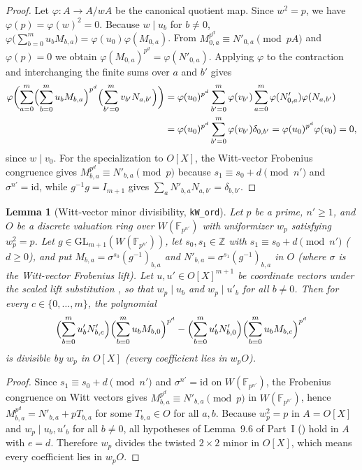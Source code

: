 \documentclass[11pt]{amsart}
\newcommand{\Z}{\mathbb{Z}}
\theoremstyle{plain}
\newtheorem{lemma}[theorem]{Lemma}
\theoremstyle{definition}
\numberwithin{equation}{section}
\begin{document}
\begin{proof}
Let $\varphi:A\to A/wA$ be the canonical quotient map. Since $w^2=p$, we have $\varphi(p)=\varphi(w)^2=0$.
Because $w\mid u_b$ for $b\neq 0$, $\varphi\bigl(\sum_{b=0}^m u_b M_{b,a}\bigr)=\varphi(u_0)\varphi(M_{0,a})$.
From $M_{0,a}^{p^d}\equiv N'_{0,a}\pmod{pA}$ and $\varphi(p)=0$ we obtain
$\varphi(M_{0,a})^{p^d}=\varphi(N'_{0,a})$. Applying $\varphi$ to the contraction and interchanging
the finite sums over $a$ and $b'$ gives
\begin{align*}
\varphi\biggl(\sum_{a=0}^m\Bigl(\sum_{b=0}^m u_b M_{b,a}\Bigr)^{p^d}\Bigl(\sum_{b'=0}^m v_{b'}N_{a,b'}\Bigr)\biggr)
&=\varphi(u_0)^{p^d}\sum_{b'=0}^m\varphi(v_{b'})\sum_{a=0}^m\varphi(N'_{0,a})\varphi(N_{a,b'})\\
&=\varphi(u_0)^{p^d}\sum_{b'=0}^m\varphi(v_{b'})\delta_{0,b'}=\varphi(u_0)^{p^d}\varphi(v_0)=0,
\end{align*}
since $w\mid v_0$. For the specialization to $O[X]$, the Witt-vector Frobenius congruence gives
$M_{b,a}^{p^d}\equiv N'_{b,a}\pmod p$ because $s_1\equiv s_0+d\pmod{n'}$ and $\sigma^{n'}=\mathrm{id}$,
while $g^{-1}g=I_{m+1}$ gives $\sum_a N'_{b,a}N_{a,b'}=\delta_{b,b'}$.
\end{proof}

\begin{lemma}[Witt-vector minor divisibility, \texttt{kW\_ord}]\label{lem:kWord}
Let $p$ be a prime, $n'\ge1$, and $O$ be a discrete valuation ring over $W(\mathbb F_{p^{n'}})$
with uniformizer $w_p$ satisfying $w_p^2=p$. Let $g\in\mathrm{GL}_{m+1}(W(\mathbb F_{p^{n'}}))$,
let $s_0,s_1\in\Z$ with $s_1\equiv s_0+d\pmod{n'}$ ($d\ge0$), and put
$M_{b,a}=\sigma^{s_0}(g^{-1})_{b,a}$ and $N'_{b,a}=\sigma^{s_1}(g^{-1})_{b,a}$ in $O$ (where
$\sigma$ is the Witt-vector Frobenius lift). Let $u,u'\in O[X]^{m+1}$ be coordinate vectors under
the scaled lift substitution , so that $w_p\mid u_b$ and $w_p\mid u'_b$ for all
$b\neq 0$. Then for every $c\in\{0,\dots,m\}$, the polynomial
\[
\Bigl(\sum_{b=0}^m u'_b N'_{b,c}\Bigr)\Bigl(\sum_{b=0}^m u_b M_{b,0}\Bigr)^{p^d}
-\Bigl(\sum_{b=0}^m u'_b N'_{b,0}\Bigr)\Bigl(\sum_{b=0}^m u_b M_{b,c}\Bigr)^{p^d}
\]
is divisible by $w_p$ in $O[X]$ (every coefficient lies in $w_p O$).
\end{lemma}

\begin{proof}
Since $s_1\equiv s_0+d\pmod{n'}$ and $\sigma^{n'}=\mathrm{id}$ on $W(\mathbb F_{p^{n'}})$, the
Frobenius congruence on Witt vectors gives $M_{b,a}^{p^d}\equiv N'_{b,a}\pmod p$ in
$W(\mathbb F_{p^{n'}})$, hence $M_{b,a}^{p^d}=N'_{b,a}+p T_{b,a}$ for some $T_{b,a}\in O$ for all
$a,b$. Because $w_p^2=p$ in $A=O[X]$ and $w_p\mid u_b, u'_b$ for all $b\neq0$, all hypotheses of
Lemma~9.6 of Part~I () hold in $A$ with $e=d$. Therefore $w_p$ divides the
twisted $2\times2$ minor in $O[X]$, which means every coefficient lies in $w_p O$.
\end{proof}
\end{document}
